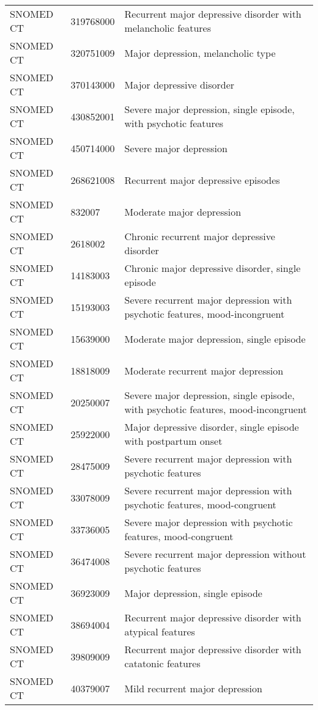 \begin{longtable}{p{}p{}p{}}
  SNOMED CT & 319768000 & Recurrent major depressive disorder with melancholic features \\ 
  SNOMED CT & 320751009 & Major depression, melancholic type \\ 
  SNOMED CT & 370143000 & Major depressive disorder \\ 
  SNOMED CT & 430852001 & Severe major depression, single episode, with psychotic features \\ 
  SNOMED CT & 450714000 & Severe major depression \\ 
  SNOMED CT & 268621008 & Recurrent major depressive episodes \\ 
  SNOMED CT & 832007 & Moderate major depression \\ 
  SNOMED CT & 2618002 & Chronic recurrent major depressive disorder \\ 
  SNOMED CT & 14183003 & Chronic major depressive disorder, single episode \\ 
  SNOMED CT & 15193003 & Severe recurrent major depression with psychotic features, mood-incongruent \\ 
  SNOMED CT & 15639000 & Moderate major depression, single episode \\ 
  SNOMED CT & 18818009 & Moderate recurrent major depression \\ 
  SNOMED CT & 20250007 & Severe major depression, single episode, with psychotic features, mood-incongruent \\ 
  SNOMED CT & 25922000 & Major depressive disorder, single episode with postpartum onset \\ 
  SNOMED CT & 28475009 & Severe recurrent major depression with psychotic features \\ 
  SNOMED CT & 33078009 & Severe recurrent major depression with psychotic features, mood-congruent \\ 
  SNOMED CT & 33736005 & Severe major depression with psychotic features, mood-congruent \\ 
  SNOMED CT & 36474008 & Severe recurrent major depression without psychotic features \\ 
  SNOMED CT & 36923009 & Major depression, single episode \\ 
  SNOMED CT & 38694004 & Recurrent major depressive disorder with atypical features \\ 
  SNOMED CT & 39809009 & Recurrent major depressive disorder with catatonic features \\ 
  SNOMED CT & 40379007 & Mild recurrent major depression \\ 

\end{longtable}
